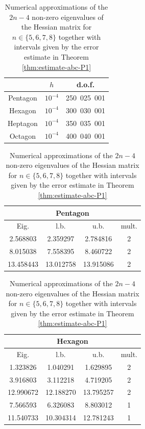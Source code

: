 \documentclass[11pt]{article}
\newcommand{\smaller}{\small}
\numberwithin{equation}{section}\newtheorem*{jepEnonce}{\jepEnonceTitle}\newenvironment{enonce*}[1]{\def\jepEnonceTitle{#1}\jepEnonce}{\endjepEnonce}\newtheorem*{conj*}{Conjecture}
\theoremstyle{plain}
\theoremstyle{definition}
\begin{document}
\begin{table}[htb]
\smaller
\caption{Size of the computational problems for the finite element computations.}
\label{table:size-comp}
\begin{tabular}{|c|c|c|}
\hline
& $h$ & d.o.f. \\ \hline
Pentagon & $10^{-4}$ & 250\ 025\ 001\\ \hline
Hexagon & $10^{-4}$ & 300\ 030\ 001\\ \hline
Heptagon & $10^{-4}$ & 350\ 035\ 001\\ \hline
Octagon & $10^{-4}$ & 400\ 040\ 001\\ \hline
\end{tabular}

\vspace*{1.5\baselineskip}
\caption{Numerical approximations of the $2n-4$ non-zero eigenvalues of the Hessian matrix for $n\in \{5,6,7,8\}$ together with intervals given by the error estimate in Theorem \ref{thm:estimate-abc-P1}}
\label{tab:eig-bounds}
\raisebox{12.5pt}
{\begin{minipage}{.49\textwidth}
\begin{tabular}{|c|c|c|c|}
\hline
\multicolumn{4}{|c|}{Pentagon} \\
\hline
Eig. & l.b. & u.b. & mult. \\ \hline
2.568803 & 2.359297 & 2.784816 & 2\\ \hline
8.015038 & 7.558395 & 8.460722 & 2\\ \hline
13.458443 & 13.012758 & 13.915086 & 2\\ \hline
\end{tabular}
\end{minipage}}
\begin{minipage}{.49\textwidth}
\begin{tabular}{|c|c|c|c|}
\hline
\multicolumn{4}{|c|}{Hexagon} \\
\hline
Eig. & l.b. & u.b. & mult. \\ \hline
1.323826 & 1.040291 & 1.629895 & 2\\ \hline
3.916803 & 3.112218 & 4.719205 & 2\\ \hline
12.990672 & 12.188270 & 13.795257 & 2\\ \hline
7.566593 & 6.326083 & 8.803012 & 1 \\ \hline
11.540733 & 10.304314 & 12.781243 & 1 \\ \hline
\end{tabular}
\end{minipage}\par\medskip\noindent

\end{table}
\end{document}
